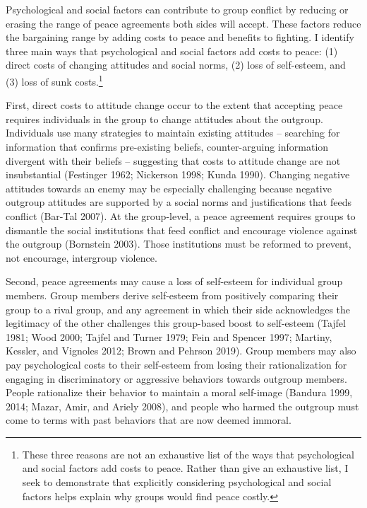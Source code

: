 \documentclass[11pt]{article}
\begin{document}
Psychological and social factors can contribute to group conflict by
reducing or erasing the range of peace agreements both sides will
accept. These factors reduce the bargaining range by adding costs to
peace and benefits to fighting. I identify three main ways that
psychological and social factors add costs to peace: (1) direct costs of
changing attitudes and social norms, (2) loss of self-esteem, and (3)
loss of sunk costs.\footnote{These three reasons are not an exhaustive
  list of the ways that psychological and social factors add costs to
  peace. Rather than give an exhaustive list, I seek to demonstrate that
  explicitly considering psychological and social factors helps explain
  why groups would find peace costly.}

First, direct costs to attitude change occur to the extent that
accepting peace requires individuals in the group to change attitudes
about the outgroup. Individuals use many strategies to maintain existing
attitudes -- searching for information that confirms pre-existing
beliefs, counter-arguing information divergent with their beliefs --
suggesting that costs to attitude change are not insubstantial
(Festinger 1962; Nickerson 1998; Kunda 1990). Changing negative
attitudes towards an enemy may be especially challenging because
negative outgroup attitudes are supported by a social norms and
justifications that feeds conflict (Bar-Tal 2007). At the group-level, a
peace agreement requires groups to dismantle the social institutions
that feed conflict and encourage violence against the outgroup
(Bornstein 2003). Those institutions must be reformed to prevent, not
encourage, intergroup violence.

Second, peace agreements may cause a loss of self-esteem for individual
group members. Group members derive self-esteem from positively
comparing their group to a rival group, and any agreement in which their
side acknowledges the legitimacy of the other challenges this
group-based boost to self-esteem (Tajfel 1981; Wood 2000; Tajfel and
Turner 1979; Fein and Spencer 1997; Martiny, Kessler, and Vignoles 2012;
Brown and Pehrson 2019). Group members may also pay psychological costs
to their self-esteem from losing their rationalization for engaging in
discriminatory or aggressive behaviors towards outgroup members. People
rationalize their behavior to maintain a moral self-image (Bandura 1999,
2014; Mazar, Amir, and Ariely 2008), and people who harmed the outgroup
must come to terms with past behaviors that are now deemed immoral.
\end{document}
